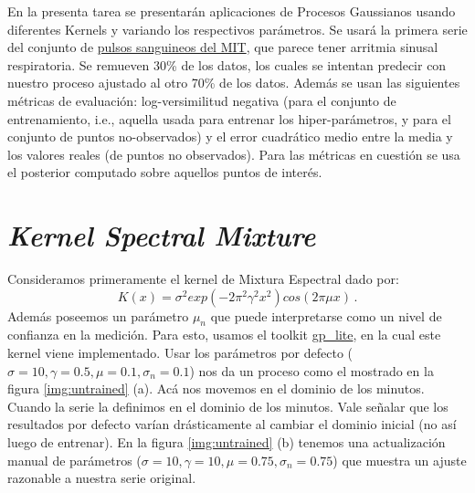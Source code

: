 \documentclass[letterpaper,11pt,oneside]{article}
\theoremstyle{break}
\begin{document}
	





\inserttitle

En la presenta tarea se presentarán aplicaciones de Procesos Gaussianos usando diferentes Kernels y variando los respectivos parámetros. Se usará la primera serie del conjunto de \href{https://ecg.mit.edu/time-series/}{pulsos sanguineos del MIT}, que parece tener arritmia sinusal respiratoria. Se remueven 30\% de los datos, los cuales se intentan predecir con nuestro proceso ajustado al otro 70\% de los datos. Además se usan las siguientes métricas de evaluación: log-versimilitud negativa (para el conjunto de entrenamiento, i.e., aquella usada para entrenar los hiper-parámetros, y para el conjunto de puntos no-observados) y el error cuadrático medio entre la media y los valores reales (de puntos no observados). Para las métricas en cuestión se usa el posterior computado sobre aquellos puntos de interés.

\section{\textit{Kernel Spectral Mixture}}
Consideramos primeramente el kernel de Mixtura Espectral dado por: 
$$K(x)=\sigma^2 exp(-2\pi^2\gamma^2x^2)cos(2\pi\mu x)\,.$$
Además poseemos un parámetro $\mu_n$ que puede interpretarse como un nivel de confianza en la medición. Para esto, usamos el toolkit \href{https://github.com/GAMES-UChile/The_Art_of_Gaussian_Processes}{gp\_lite}, en la cual este kernel viene implementado. Usar los parámetros por defecto ($\sigma = 10, \gamma = 0.5, \mu = 0.1, \sigma_n = 0.1$) nos da un proceso como el mostrado en la figura \ref{img:untrained} (a). Acá nos movemos en el dominio de los minutos. Cuando la serie la definimos en el dominio de los minutos. Vale señalar que los resultados por defecto varían drásticamente al cambiar el dominio inicial (no así luego de entrenar). En la figura \ref{img:untrained} (b) tenemos una actualización manual de parámetros ($\sigma = 10, \gamma = 10, \mu = 0.75, \sigma_n = 0.75$) que muestra un ajuste razonable a nuestra serie original. %
\end{document}
